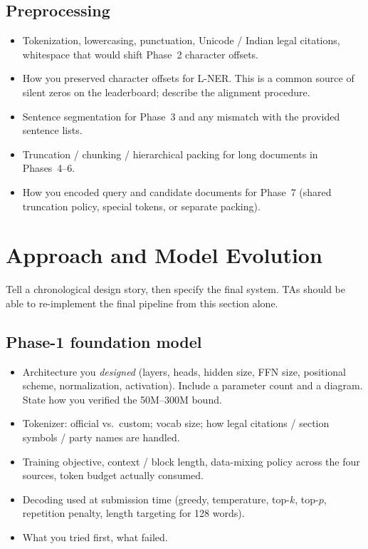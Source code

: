 \documentclass[11pt, oneside]{article}
\begin{document}
\subsection{Preprocessing}
\begin{itemize}[leftmargin=*]
    \item Tokenization, lowercasing, punctuation, Unicode / Indian legal citations, whitespace that would shift Phase~2 character offsets.
    \item How you preserved character offsets for L-NER. This is a common source of silent zeros on the leaderboard; describe the alignment procedure.
    \item Sentence segmentation for Phase~3 and any mismatch with the provided sentence lists.
    \item Truncation / chunking / hierarchical packing for long documents in Phases~4--6.
    \item How you encoded query and candidate documents for Phase~7 (shared truncation policy, special tokens, or separate packing).
\end{itemize}
\section{Approach and Model Evolution}
Tell a chronological design story, then specify the final system. TAs should be able to re-implement the final pipeline from this section alone.
\subsection{Phase-1 foundation model}
\begin{itemize}[leftmargin=*]
    \item Architecture you \emph{designed} (layers, heads, hidden size, FFN size, positional scheme, normalization, activation). Include a parameter count and a diagram. State how you verified the 50M--300M bound.
    \item Tokenizer: official vs.\ custom; vocab size; how legal citations / section symbols / party names are handled.
    \item Training objective, context / block length, data-mixing policy across the four sources, token budget actually consumed.
    \item Decoding used at submission time (greedy, temperature, top-$k$, top-$p$, repetition penalty, length targeting for 128 words).
    \item What you tried first, what failed.
\end{itemize}
\end{document}

